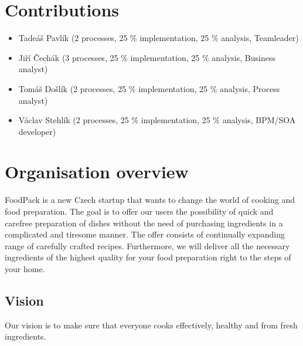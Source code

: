 \documentclass[11pt,a4paper]{article}
\begin{document}
\setlength{\parskip}{0pt}
    \hypersetup{hidelinks}\tableofcontents
\setlength{\parskip}{0pt}

\newpage


\section{Contributions}

\begin{itemize}
    \item Tadeáš Pavlík (2 processes, 25 \% implementation, 25 \% analysis, Teamleader)
    \item Jiří Čechák (3 processes, 25 \% implementation, 25 \% analysis, Business analyst)
    \item Tomáš Došlík (2 processes, 25 \% implementation, 25 \% analysis, Process analyst)
    \item Václav Stehlík (2 processes, 25 \% implementation, 25 \% analysis, BPM/SOA developer)
\end{itemize}


\section{Organisation overview}

FoodPack is a new Czech startup that wants to change the world of cooking and food preparation. The goal is to offer our users the possibility of quick and carefree preparation of dishes without the need of purchasing ingredients in a complicated and tiresome manner. The offer consists of continually expanding range of carefully crafted recipes. Furthermore, we will deliver all the necessary ingredients of the highest quality for your food preparation right to the steps of your home.


\subsection{Vision}

Our vision is to make sure that everyone cooks effectively, healthy and from fresh ingredients.
\end{document}
